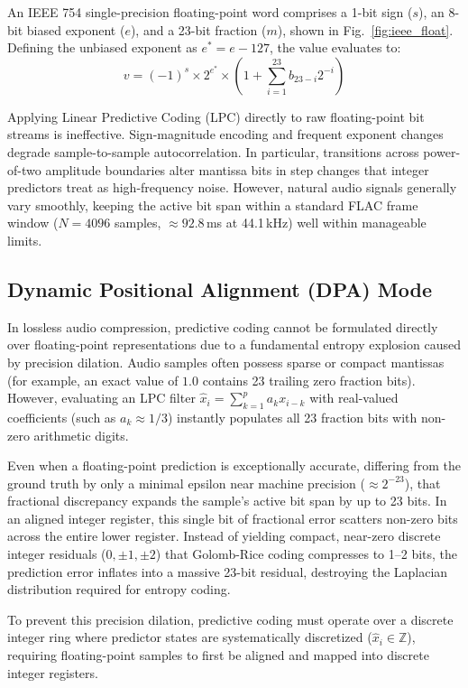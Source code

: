 \documentclass[10pt,twocolumn]{article}
\begin{document}
An IEEE 754 single-precision floating-point word comprises a 1-bit sign ($s$), an 8-bit biased exponent ($e$), and a 23-bit fraction ($m$), shown in Fig.~\ref{fig:ieee_float}. Defining the unbiased exponent as $e^* = e - 127$, the value evaluates to:
\begin{equation}
	v = (-1)^s \times 2^{e^*} \times \left(1 + \sum_{i=1}^{23} b_{23-i} 2^{-i}\right)
\end{equation}

Applying Linear Predictive Coding (LPC) directly to raw floating-point bit streams is ineffective. Sign-magnitude encoding and frequent exponent changes degrade sample-to-sample autocorrelation. In particular, transitions across power-of-two amplitude boundaries alter mantissa bits in step changes that integer predictors treat as high-frequency noise. However, natural audio signals generally vary smoothly, keeping the active bit span within a standard FLAC frame window ($N = 4096$ samples, $\approx 92.8$\,ms at 44.1\,kHz) well within manageable limits.

\subsection{Dynamic Positional Alignment (DPA) Mode}
In lossless audio compression, predictive coding cannot be formulated directly over floating-point representations due to a fundamental entropy explosion caused by precision dilation. Audio samples often possess sparse or compact mantissas (for example, an exact value of $1.0$ contains 23 trailing zero fraction bits). However, evaluating an LPC filter $\hat{x}_i = \sum_{k=1}^p a_k x_{i-k}$ with real-valued coefficients (such as $a_k \approx 1/3$) instantly populates all 23 fraction bits with non-zero arithmetic digits.

Even when a floating-point prediction is exceptionally accurate, differing from the ground truth by only a minimal epsilon near machine precision ($\approx 2^{-23}$), that fractional discrepancy expands the sample's active bit span by up to 23 bits. In an aligned integer register, this single bit of fractional error scatters non-zero bits across the entire lower register. Instead of yielding compact, near-zero discrete integer residuals ($0, \pm 1, \pm 2$) that Golomb-Rice coding compresses to 1--2 bits, the prediction error inflates into a massive 23-bit residual, destroying the Laplacian distribution required for entropy coding.

To prevent this precision dilation, predictive coding must operate over a discrete integer ring where predictor states are systematically discretized ($\hat{x}_i \in \mathbb{Z}$), requiring floating-point samples to first be aligned and mapped into discrete integer registers.
\end{document}
